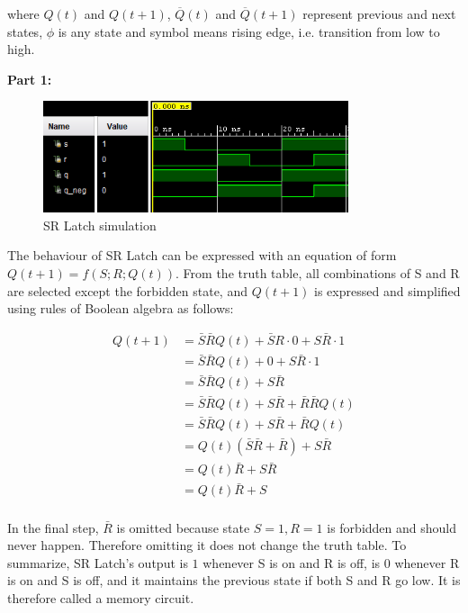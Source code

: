 \documentclass{article}
\begin{document}
	where $Q(t)$ and $Q(t+1)$, $\overline{Q}(t)$ and $\overline{Q}(t+1)$ represent previous and next states, $\phi$ is any state and  symbol means rising edge, i.e. transition from low to high. \\
	
	\newpage

	\textbf{Part 1:}
	\begin{figure}[h]
		\centering
		\includegraphics[width=0.8\textwidth]{part1.png}
		\caption{SR Latch simulation}
		\centering
	\end{figure}	
	
	The behaviour of SR Latch can be expressed with an equation of form $Q(t + 1) = f(S; R; Q(t)).$ From the truth table, all combinations of S and R are selected except the forbidden state, and $Q(t + 1)$ is expressed and simplified using rules of Boolean algebra as follows:

	\begin{align*}			 
	 Q(t + 1) &= \bar{S} \bar{R} Q(t) + \bar{S} R \cdot 0 + S \bar {R} \cdot 1 \tag{Truth table} \\
	 &= \bar{S} \bar{R} Q(t) + 0 + S  \bar{R} \cdot 1 \tag{Dominance} \\
	 &= \bar{S} \bar{R} Q(t) + S  \bar{R} \tag{Identity} \\
	 &= \bar{S} \bar{R} Q(t) + S \bar{R} + \bar{R} \bar{R} Q(t) \tag{Consensus theorem} \\
	 &= \bar{S} \bar{R} Q(t) + S \bar{R} + \bar{R} Q(t) \tag{Idempotency} \\
	 &=  Q(t)(\bar{S} \bar{R} + \bar{R}) + S \bar{R}  \tag{Distributivity} \\
	 &=  Q(t)\bar{R} + S \bar{R}  \tag{Absorption} \\
	 &=  Q(t)\bar{R} + S\\
	\end{align*}

	In the final step, $\bar{R}$ is omitted because state $S = 1, R = 1$ is forbidden and should never happen. Therefore omitting it does not change the truth table. To summarize, SR Latch's output is $1$ whenever S is on and R is off, is $0$ whenever R is on and S is off, and it maintains the previous state if both S and R go low. It is therefore called a memory circuit. \\
\end{document}
